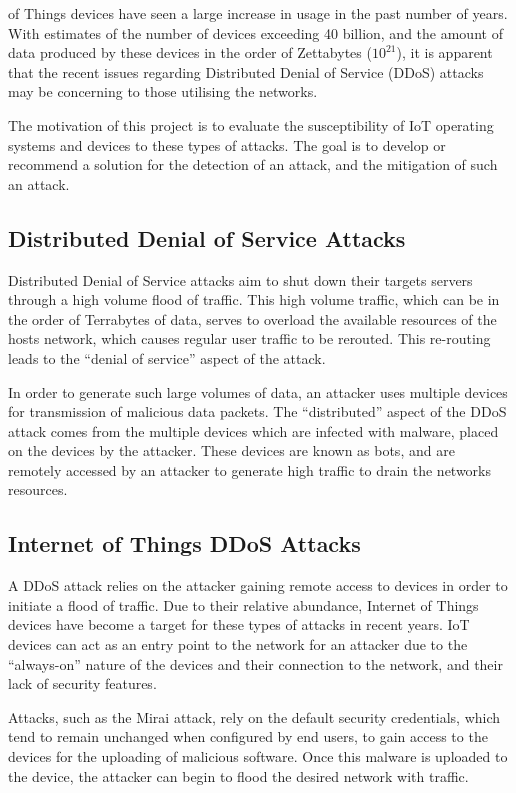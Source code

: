  of Things devices have seen a large increase in usage
in the past number of years. With estimates of the number of devices exceeding
40 billion\cite{idc_2019}, and the amount of data produced by these devices in the order
of Zettabytes\cite{idc_2019} ($10^{21}$), it is apparent that the recent issues
regarding Distributed Denial of Service (DDoS) attacks may be concerning to
those utilising the networks.

The motivation of this project is to evaluate the susceptibility of IoT
operating systems and devices to these types of attacks. The goal is to develop
or recommend a solution for the detection of an attack, and the mitigation of
such an attack.

\subsection{Distributed Denial of Service Attacks}

Distributed Denial of Service attacks aim to shut down their targets servers
through a high volume flood of traffic. This high volume traffic, which can be
in the order of Terrabytes of data, serves to overload the available resources
of the hosts network, which causes regular user traffic to be rerouted. This
re-routing leads to the ``denial of service'' aspect of the attack.

In order to generate such large volumes of data, an attacker uses multiple
devices for transmission of malicious data packets. The ``distributed'' aspect of
the DDoS attack comes from the multiple devices which are infected with
malware, placed on the devices by the attacker. These devices are known as bots, and
are remotely accessed by an attacker to generate high traffic to drain the
networks resources.

\subsection{Internet of Things DDoS Attacks}

A DDoS attack relies on the attacker gaining remote access to devices in order
to initiate a flood of traffic. Due to their relative abundance, Internet of
Things devices have become a target for these types of attacks in recent years.
IoT devices can act as an entry point to the network for an attacker due to the
``always-on'' nature of the devices and their connection to the network, and
their lack of security features.

Attacks, such as the Mirai attack, rely on the default security credentials,
which tend to remain unchanged when configured by end users, to gain access to
the devices for the uploading of malicious software. Once this
malware is uploaded to the device, the attacker can begin to flood the desired
network with traffic\cite{7971869}.

